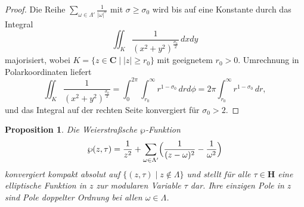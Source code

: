 \documentclass[a4paper,twoside,openright]{report}
\newtheorem{prop}[thm]{Proposition}
\theoremstyle{definition}
\theoremstyle{remark}
\begin{document}
\begin{proof}
  Die Reihe $\sum_{\omega \in \Lambda'} \frac 1{|\omega|^\sigma}$ mit $\sigma \ge \sigma_0$
  wird bis auf eine Konstante durch das Integral
  \[
    \iint_K \frac{1} {(x^2 + y^2)^{\frac{\sigma_0} 2}} \, dx dy
  \]
  majorisiert, wobei $K = \{z \in \mathbf C \mid |z| \ge r_0\}$ mit geeignetem
  $r_0 > 0$. Umrechnung in Polarkoordinaten liefert
  \[
    \iint_K \frac 1 {(x^2 + y^2)^{\frac {\sigma_0} 2}}
    = \int_0^{2\pi} \int_{r_0}^\infty r^{1 - \sigma_0} \, dr d\phi
    = 2 \pi \int_{r_0}^\infty r^{1 - \sigma_0} \, dr,
  \]
  und das Integral auf der rechten Seite konvergiert für $\sigma_0 > 2$.
\end{proof}

\begin{prop}
  Die \emph{Weierstraßsche $\wp$-Funktion}
  \[
    \wp(z, \tau) = \frac 1 {z^2} + \sum_{\omega \in \Lambda'} \Bigl(\frac 1 {(z - \omega)^2} -  \frac 1{\omega^2}\Bigr)
  \]
  konvergiert kompakt absolut auf $\{(z, \tau) \mid z \notin \Lambda\}$
  und stellt für alle $\tau \in \mathbf H$ eine elliptische Funktion
  in $z$ zur modularen Variable $\tau$ dar. Ihre einzigen Pole in $z$ sind
  Pole doppelter Ordnung bei allen $\omega \in \Lambda$.
\end{prop}
\end{document}
